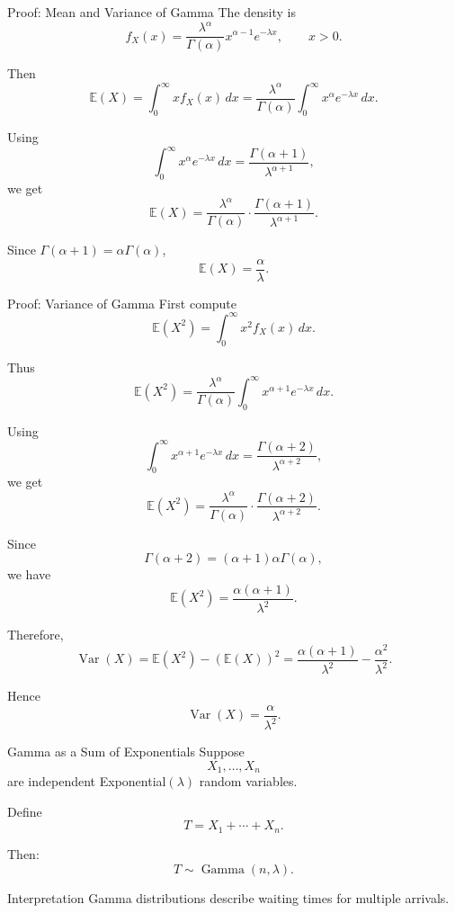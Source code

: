\begin{frame}{Proof: Mean and Variance of Gamma}
The density is
\[
f_X(x)
=
\frac{\lambda^\alpha}{\Gamma(\alpha)}
x^{\alpha-1}e^{-\lambda x},
\qquad x>0.
\]

Then
\[
\mathbb{E}(X)
=
\int_0^\infty x f_X(x)\,dx
=
\frac{\lambda^\alpha}{\Gamma(\alpha)}
\int_0^\infty x^\alpha e^{-\lambda x}\,dx.
\]

Using
\[
\int_0^\infty x^\alpha e^{-\lambda x}\,dx
=
\frac{\Gamma(\alpha+1)}{\lambda^{\alpha+1}},
\]
we get
\[
\mathbb{E}(X)
=
\frac{\lambda^\alpha}{\Gamma(\alpha)}
\cdot
\frac{\Gamma(\alpha+1)}{\lambda^{\alpha+1}}.
\]

Since \(\Gamma(\alpha+1)=\alpha\Gamma(\alpha)\),
\[
\mathbb{E}(X)=\frac{\alpha}{\lambda}.
\]
\end{frame}



\begin{frame}{Proof: Variance of Gamma}
First compute
\[
\mathbb{E}(X^2)
=
\int_0^\infty x^2 f_X(x)\,dx.
\]

Thus
\[
\mathbb{E}(X^2)
=
\frac{\lambda^\alpha}{\Gamma(\alpha)}
\int_0^\infty x^{\alpha+1}e^{-\lambda x}\,dx.
\]

Using
\[
\int_0^\infty x^{\alpha+1}e^{-\lambda x}\,dx
=
\frac{\Gamma(\alpha+2)}{\lambda^{\alpha+2}},
\]
we get
\[
\mathbb{E}(X^2)
=
\frac{\lambda^\alpha}{\Gamma(\alpha)}
\cdot
\frac{\Gamma(\alpha+2)}{\lambda^{\alpha+2}}.
\]

Since
\[
\Gamma(\alpha+2)
=
(\alpha+1)\alpha\Gamma(\alpha),
\]
we have
\[
\mathbb{E}(X^2)
=
\frac{\alpha(\alpha+1)}{\lambda^2}.
\]

Therefore,
\[
\operatorname{Var}(X)
=
\mathbb{E}(X^2)-(\mathbb{E}(X))^2
=
\frac{\alpha(\alpha+1)}{\lambda^2}
-
\frac{\alpha^2}{\lambda^2}.
\]

Hence
\[
\operatorname{Var}(X)=\frac{\alpha}{\lambda^2}.
\]
\end{frame}





\begin{frame}{Gamma as a Sum of Exponentials}
Suppose
\[
X_1,\dots,X_n
\]
are independent Exponential$(\lambda)$ random variables.

Define
\[
T=X_1+\cdots+X_n.
\]

Then:
\[
{
T\sim \operatorname{Gamma}(n,\lambda).
}
\]




\begin{keybox}{Interpretation}
Gamma distributions describe waiting times for multiple arrivals.
\end{keybox}
\end{frame}



